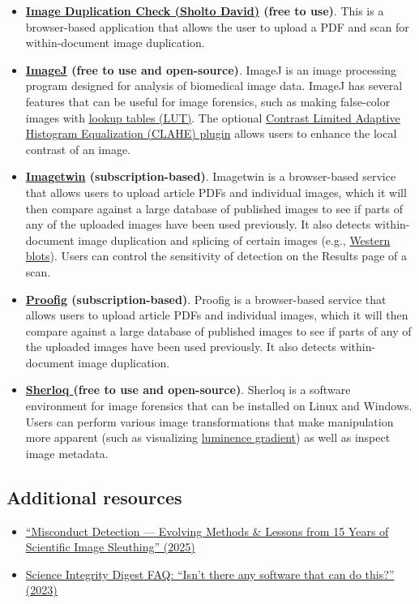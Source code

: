 \documentclass[letterpaper, 12pt]{article}
\begin{document}
\begin{itemize}
    \item \textbf{\href{https://sholtodavid.pythonanywhere.com/}{Image Duplication Check (Sholto David)} (free to use)}. This is a browser-based application that allows the user to upload a PDF and scan for within-document image duplication. 
    \item \textbf{\href{https://imagej.net/ij/}{ImageJ} (free to use and open-source)}. ImageJ is an image processing program designed for analysis of biomedical image data. ImageJ has several features that can be useful for image forensics, such as making false-color images with \href{https://imagej.net/ij/docs/concepts.html}{lookup tables (LUT)}. The optional \href{https://imagej.net/ij/plugins/clahe/index.html}{Contrast Limited Adaptive Histogram Equalization (CLAHE) plugin} allows users to enhance the local contrast of an image.
    \item \textbf{\href{https://imagetwin.ai/}{Imagetwin} (subscription-based)}. Imagetwin is a browser-based service that allows users to upload article PDFs and individual images, which it will then compare against a large database of published images to see if parts of any of the uploaded images have been used previously. It also detects within-document image duplication and splicing of certain images (e.g., \href{https://en.wikipedia.org/wiki/Western_blot}{Western blots}). Users can control the sensitivity of detection on the Results page of a scan.
    \item \textbf{\href{https://www.proofig.com/}{Proofig} (subscription-based)}. Proofig is a browser-based service that allows users to upload article PDFs and individual images, which it will then compare against a large database of published images to see if parts of any of the uploaded images have been used previously. It also detects within-document image duplication.
    \item \textbf{\href{https://github.com/GuidoBartoli/sherloq}{Sherloq } (free to use and open-source)}. Sherloq is a software environment for image forensics that can be installed on Linux and Windows. Users can perform various image transformations that make manipulation more apparent (such as visualizing \href{https://en.wikipedia.org/wiki/Image_gradient}{luminence gradient}) as well as inspect image metadata.
\end{itemize}

\subsection*{Additional resources}

\begin{itemize}
    \setlength\itemsep{-0.5em}
    \item \href{https://doi.org/10.1017/jme.2025.32}{``Misconduct Detection — Evolving Methods \& Lessons from 15 Years of Scientific Image Sleuthing'' (2025)}
    \item \href{https://scienceintegritydigest.com/frequently-asked-questions/}{Science Integrity Digest FAQ: ``Isn't there any software that can do this?'' (2023)}
\end{itemize}
\end{document}
